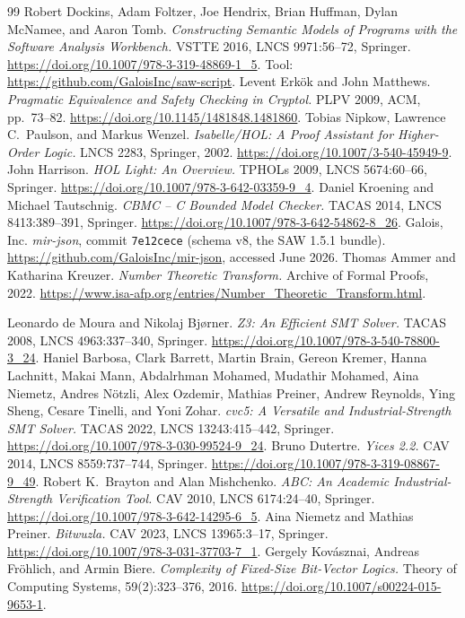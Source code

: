 \documentclass[11pt]{article}
\begin{document}
\begin{thebibliography}{99}
 Robert Dockins, Adam Foltzer, Joe Hendrix, Brian Huffman, Dylan McNamee, and Aaron
  Tomb. \emph{Constructing Semantic Models of Programs with the Software Analysis Workbench.}
  VSTTE 2016, LNCS 9971:56--72, Springer. \url{https://doi.org/10.1007/978-3-319-48869-1_5}.
  Tool: \url{https://github.com/GaloisInc/saw-script}.
 Levent Erk\"ok and John Matthews. \emph{Pragmatic Equivalence and Safety Checking
  in Cryptol.} PLPV 2009, ACM, pp.\ 73--82. \url{https://doi.org/10.1145/1481848.1481860}.
 Tobias Nipkow, Lawrence C.\ Paulson, and Markus Wenzel. \emph{Isabelle/HOL:
  A Proof Assistant for Higher-Order Logic.} LNCS 2283, Springer, 2002.
  \url{https://doi.org/10.1007/3-540-45949-9}.
 John Harrison. \emph{HOL Light: An Overview.} TPHOLs 2009, LNCS 5674:60--66,
  Springer. \url{https://doi.org/10.1007/978-3-642-03359-9_4}.
 Daniel Kroening and Michael Tautschnig. \emph{CBMC -- C Bounded Model Checker.}
  TACAS 2014, LNCS 8413:389--391, Springer. \url{https://doi.org/10.1007/978-3-642-54862-8_26}.
 Galois, Inc. \emph{mir-json}, commit \texttt{7e12cece} (schema v8, the SAW 1.5.1
  bundle). \url{https://github.com/GaloisInc/mir-json}, accessed June 2026.
 Thomas Ammer and Katharina Kreuzer. \emph{Number Theoretic Transform.}
  Archive of Formal Proofs, 2022.
  \url{https://www.isa-afp.org/entries/Number_Theoretic_Transform.html}.

 Leonardo de Moura and Nikolaj Bj\o rner. \emph{Z3: An Efficient SMT Solver.}
  TACAS 2008, LNCS 4963:337--340, Springer. \url{https://doi.org/10.1007/978-3-540-78800-3_24}.
 Haniel Barbosa, Clark Barrett, Martin Brain, Gereon Kremer, Hanna Lachnitt, Makai
  Mann, Abdalrhman Mohamed, Mudathir Mohamed, Aina Niemetz, Andres N\"otzli, Alex Ozdemir, Mathias
  Preiner, Andrew Reynolds, Ying Sheng, Cesare Tinelli, and Yoni Zohar. \emph{cvc5: A Versatile and
  Industrial-Strength SMT Solver.} TACAS 2022, LNCS 13243:415--442, Springer.
  \url{https://doi.org/10.1007/978-3-030-99524-9_24}.
 Bruno Dutertre. \emph{Yices 2.2.} CAV 2014, LNCS 8559:737--744, Springer.
  \url{https://doi.org/10.1007/978-3-319-08867-9_49}.
 Robert K.\ Brayton and Alan Mishchenko. \emph{ABC: An Academic Industrial-Strength
  Verification Tool.} CAV 2010, LNCS 6174:24--40, Springer.
  \url{https://doi.org/10.1007/978-3-642-14295-6_5}.
 Aina Niemetz and Mathias Preiner. \emph{Bitwuzla.} CAV 2023, LNCS 13965:3--17,
  Springer. \url{https://doi.org/10.1007/978-3-031-37703-7_1}.
 Gergely Kov\'asznai, Andreas Fr\"ohlich, and Armin Biere. \emph{Complexity of
  Fixed-Size Bit-Vector Logics.} Theory of Computing Systems, 59(2):323--376, 2016.
  \url{https://doi.org/10.1007/s00224-015-9653-1}.


\end{thebibliography}
\end{document}

